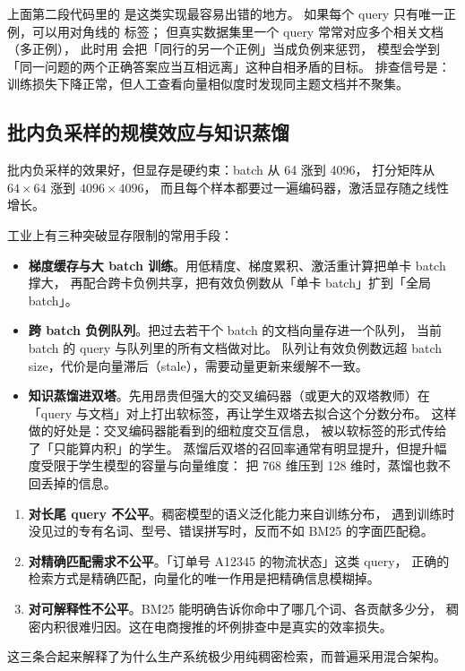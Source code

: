 \begin{pitfall}[多正例时的标签陷阱]
上面第二段代码里的  是这类实现最容易出错的地方。
如果每个 query 只有唯一正例，可以用对角线的  标签；
但真实数据集里一个 query 常常对应多个相关文档（多正例），
此时用  会把「同行的另一个正例」当成负例来惩罚，
模型会学到「同一问题的两个正确答案应当互相远离」这种自相矛盾的目标。
排查信号是：训练损失下降正常，但人工查看向量相似度时发现同主题文档并不聚集。
\end{pitfall}

\subsection{批内负采样的规模效应与知识蒸馏}

批内负采样的效果好，但显存是硬约束：batch 从 64 涨到 4096，
打分矩阵从 $64 \times 64$ 涨到 $4096 \times 4096$，
而且每个样本都要过一遍编码器，激活显存随之线性增长。

工业上有三种突破显存限制的常用手段：

\begin{itemize}
  \item \textbf{梯度缓存与大 batch 训练}。用低精度、梯度累积、激活重计算把单卡 batch 撑大，
        再配合跨卡负例共享，把有效负例数从「单卡 batch」扩到「全局 batch」。
  \item \textbf{跨 batch 负例队列}。把过去若干个 batch 的文档向量存进一个队列，
        当前 batch 的 query 与队列里的所有文档做对比。
        队列让有效负例数远超 batch size，代价是向量滞后（stale），需要动量更新来缓解不一致。
  \item \textbf{知识蒸馏进双塔}。先用昂贵但强大的交叉编码器（或更大的双塔教师）在
        「query 与文档」对上打出软标签，再让学生双塔去拟合这个分数分布。
        这样做的好处是：交叉编码器能看到的细粒度交互信息，
        被以软标签的形式传给了「只能算内积」的学生。
        蒸馏后双塔的召回率通常有明显提升，但提升幅度受限于学生模型的容量与向量维度：
        把 768 维压到 128 维时，蒸馏也救不回丢掉的信息。
\end{itemize}

\begin{insight}
\begin{enumerate}
  \item \textbf{对长尾 query 不公平}。稠密模型的语义泛化能力来自训练分布，
        遇到训练时没见过的专有名词、型号、错误拼写时，反而不如 BM25 的字面匹配稳。
  \item \textbf{对精确匹配需求不公平}。「订单号 A12345 的物流状态」这类 query，
        正确的检索方式是精确匹配，向量化的唯一作用是把精确信息模糊掉。
  \item \textbf{对可解释性不公平}。BM25 能明确告诉你命中了哪几个词、各贡献多少分，
        稠密内积很难归因。这在电商搜推的坏例排查中是真实的效率损失。
\end{enumerate}
这三条合起来解释了为什么生产系统极少用纯稠密检索，而普遍采用混合架构。
\end{insight}

